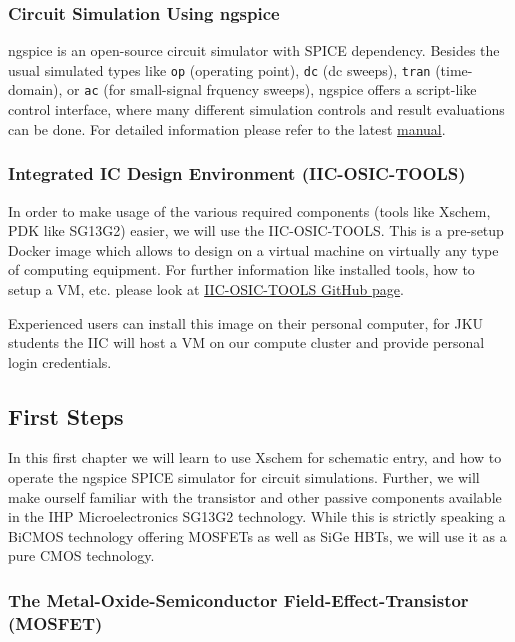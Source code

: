 \documentclass[
  a4paper,
  DIV=11,
  numbers=noendperiod]{scrartcl}
\begin{document}
\subsubsection{Circuit Simulation Using
ngspice}\label{circuit-simulation-using-ngspice}

ngspice is an open-source circuit simulator with SPICE dependency.
Besides the usual simulated types like \texttt{op} (operating point),
\texttt{dc} (dc sweeps), \texttt{tran} (time-domain), or \texttt{ac}
(for small-signal frquency sweeps), ngspice offers a script-like control
interface, where many different simulation controls and result
evaluations can be done. For detailed information please refer to the
latest
\href{https://ngspice.sourceforge.io/docs/ngspice-43-manual.pdf}{manual}.

\subsubsection{Integrated IC Design Environment
(IIC-OSIC-TOOLS)}\label{integrated-ic-design-environment-iic-osic-tools}

In order to make usage of the various required components (tools like
Xschem, PDK like SG13G2) easier, we will use the IIC-OSIC-TOOLS. This is
a pre-setup Docker image which allows to design on a virtual machine on
virtually any type of computing equipment. For further information like
installed tools, how to setup a VM, etc. please look at
\href{https://github.com/iic-jku/IIC-OSIC-TOOLS}{IIC-OSIC-TOOLS GitHub
page}.

Experienced users can install this image on their personal computer, for
JKU students the IIC will host a VM on our compute cluster and provide
personal login credentials.

\subsection{First Steps}\label{first-steps}

In this first chapter we will learn to use Xschem for schematic entry,
and how to operate the ngspice SPICE simulator for circuit simulations.
Further, we will make ourself familiar with the transistor and other
passive components available in the IHP Microelectronics SG13G2
technology. While this is strictly speaking a BiCMOS technology offering
MOSFETs as well as SiGe HBTs, we will use it as a pure CMOS technology.

\subsubsection{The Metal-Oxide-Semiconductor Field-Effect-Transistor
(MOSFET)}\label{sec-mosfet}
\end{document}
